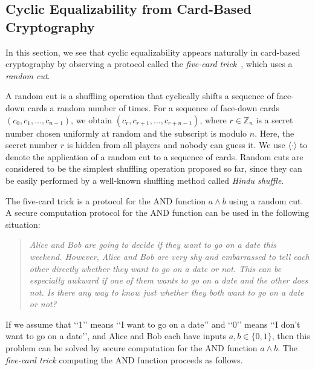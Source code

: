 \documentclass{article}
\theoremstyle{definition}
\newcommand{\bin}{\{0,1\}}
\newcommand{\Z}{\mathbb{Z}}
\begin{document}
\subsection{Cyclic Equalizability from Card-Based Cryptography}\label{ss:combinatorics_from_card}

In this section, we see that cyclic equalizability appears naturally in card-based cryptography by observing a protocol called the \emph{five-card trick}~\cite{BoerEC1989}, which uses a \emph{random cut}. 

A random cut is a shuffling operation that cyclically shifts a sequence of 
face-down
cards a random number of times. For a sequence of 
face-down
cards $(c_0, c_1, \ldots, c_{n-1})$, we obtain $(c_r, c_{r+1}, \ldots, c_{r+n-1})$, where $r \in \Z_n$ is a secret number chosen uniformly at random and the subscript is modulo $n$. 
Here, the secret number $r$ is hidden from all players and nobody can guess it. 
We use $\langle \cdot \rangle$ to denote the application of a random cut to a sequence of cards. 
Random cuts are considered to be the simplest shuffling operation proposed so far, since they can be easily performed by a well-known shuffling method called \emph{Hindu shuffle}.

The five-card trick is a protocol for the AND function $a\wedge b$ using a random cut. 
A secure computation protocol for the AND function can be used in the following situation:
\begin{quote}
{\it Alice and Bob are going to decide if they want to go on a date this weekend. 
However, Alice and Bob are very shy and embarrassed to tell each other directly whether they want to go on a date or not. 
This can be especially awkward if one of them wants to go on a date and the other does not.
Is there any way to know just whether they both want to go on a date or not?}
\end{quote}
If we assume that \lq\lq 1\rq\rq{} means \lq\lq I want to go on a date\rq\rq{} and \lq\lq 0\rq\rq{} means \lq\lq I don't want to go on a date\rq\rq, and Alice and Bob each have inputs $a,b\in \bin$, then this problem can be solved by secure computation for the AND function $a\wedge b$. 
The \emph{five-card trick} computing the AND function proceeds as follows. 
\end{document}
